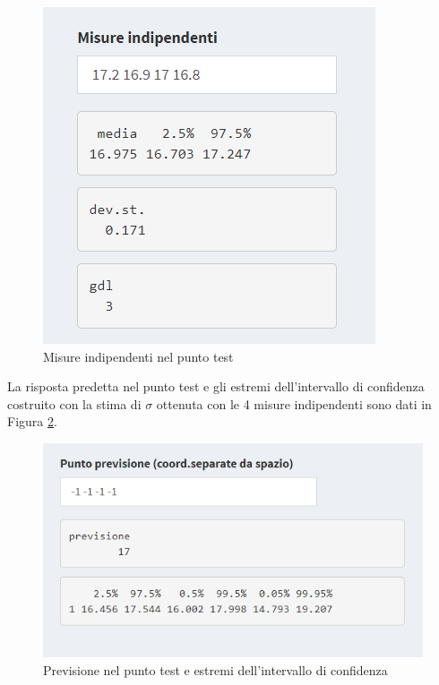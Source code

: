 \documentclass[
  11pt,
]{book}
\begin{document}
\begin{figure}[ht]

{\centering \includegraphics[width=1\linewidth]{Immagini/Fraz/08_mis_ind} 

}

\caption{Misure indipendenti nel punto test}\label{fig:fz8}
\end{figure}

La risposta predetta nel punto test e gli estremi dell'intervallo di confidenza costruito con la stima di \(\sigma\) ottenuta con le 4 misure indipendenti sono dati in Figura \ref{fig:fz9}.

\begin{figure}[ht]

{\centering \includegraphics[width=1\linewidth]{Immagini/Fraz/09_prev} 

}

\caption{Previsione nel punto test e estremi dell'intervallo di confidenza}\label{fig:fz9}
\end{figure}
\end{document}
